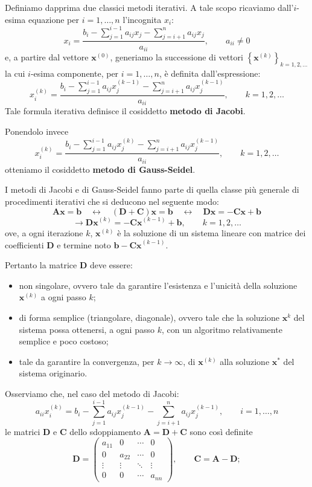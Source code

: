 Definiamo dapprima due classici metodi iterativi. A tale scopo ricaviamo dall'$i$-esima equazione
per $i=1,\dots,n$ l'incognita $x_i$:
\[x_i=\frac{b_i-\sum_{j=1}^{i-1}{a_{ij}x_j}-\sum_{j=i+1}^{n}{a_{ij}x_j}}{a_{ii}},\qquad a_{ii}\ne0\]
e, a partire dal vettore $\mathbf{x}^{(0)}$, generiamo la successione di vettori $\left\{\mathbf{x}^{(k)}
\right\}_{k=1,2,\dots}$ la cui $i$-esima componente, per $i=1,\dots,n$, è definita dall'espressione:
\[x_i^{(k)}=\frac{b_i-\sum_{j=1}^{i-1}{a_{ij}x_j^{(k-1)}}-\sum_{j=i+1}^{n}{a_{ij}x_j^{(k-1)}}}{a_{ii}},
\qquad k=1,2,\dots\]
Tale formula iterativa definisce il cosiddetto \textbf{metodo di Jacobi}.

Ponendolo invece
\[x_i^{(k)}=\frac{b_i-\sum_{j=1}^{i-1}{a_{ij}x_j^{(k)}}-\sum_{j=i+1}^{n}{a_{ij}x_j^{(k-1)}}}{a_{ii}},
\qquad k=1,2,\dots\]
otteniamo il cosiddetto \textbf{metodo di Gauss-Seidel}.

I metodi di Jacobi e di Gauss-Seidel fanno parte di quella classe più generale di procedimenti iterativi
che si deducono nel seguente modo:
\[\mathbf{Ax}=\mathbf{b}\quad\leftrightarrow\quad(\mathbf{D}+\mathbf{C})\mathbf{x}=\mathbf{b}\quad
\leftrightarrow\quad\mathbf{Dx}=-\mathbf{Cx}+\mathbf{b}\]
\[\to\mathbf{Dx}^{(k)}=-\mathbf{Cx}^{(k-1)}+\mathbf{b},\qquad k=1,2,\dots\]
ove, a ogni iterazione $k$, $\mathbf{x}^{(k)}$ è la soluzione di un sistema lineare con matrice
dei coefficienti $\mathbf{D}$ e termine noto $\mathbf{b}-\mathbf{Cx}^{(k-1)}$.

Pertanto la matrice $\mathbf{D}$ deve essere:
\begin{itemize}
    \item non singolare, ovvero tale da garantire l'esistenza e l'unicità della soluzione $\mathbf{x}^{(k)}$
    a ogni passo $k$;
    \item di forma semplice (triangolare, diagonale), ovvero tale che la soluzione $\mathbf{x}^{k}$
    del sistema possa ottenersi, a ogni passo $k$, con un algoritmo relativamente semplice e poco costoso;
    \item tale da garantire la convergenza, per $k\to\infty$, di $\mathbf{x}^{(k)}$ alla soluzione
    $\mathbf{x}^*$ del sistema originario.
\end{itemize}

Osserviamo che, nel caso del metodo di Jacobi:
\[a_{ii}x_i^{(k)}=b_i-\sum_{j=1}^{i-1}{a_{ij}x_j^{(k-1)}}-\sum_{j=i+1}^{n}{a_{ij}x_j^{(k-1)}},\qquad i=1,\dots,n\]
le matrici $\mathbf{D}$ e $\mathbf{C}$ dello sdoppiamento $\mathbf{A}=\mathbf{D}+\mathbf{C}$ sono così definite
\[\mathbf{D}=\left(
    \begin{matrix}
        a_{11} & 0 & \cdots & 0 \\
        0 & a_{22} & \cdots & 0 \\
        \vdots & \vdots & \ddots & \vdots \\
        0 & 0 & \cdots & a_{nn}
    \end{matrix}
\right),\qquad\mathbf{C}=\mathbf{A}-\mathbf{D};\]

